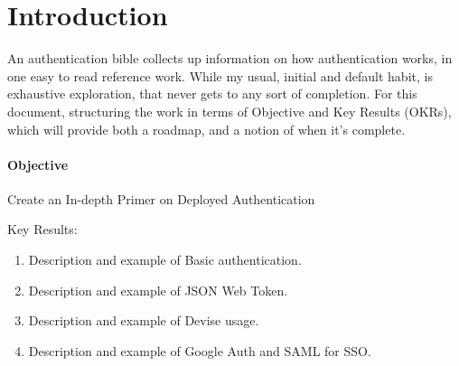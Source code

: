 \section{Introduction}

An authentication bible collects up information on how authentication works,
in one easy to read reference work. While my usual, initial and default habit,
is exhaustive exploration, that never gets to any sort of completion. For this
document, structuring the work in terms of Objective and Key Results (OKRs),
which will provide both a roadmap, and a notion of when it's complete.

\paragraph{Objective} Create an In-depth Primer on Deployed Authentication

Key Results:

\begin{enumerate}[label=KR\arabic*]
  \item Description and example of Basic authentication.
  \item Description and example of JSON Web Token.
  \item Description and example of Devise usage.
  \item Description and example of Google Auth and SAML for SSO.
\end{enumerate}

